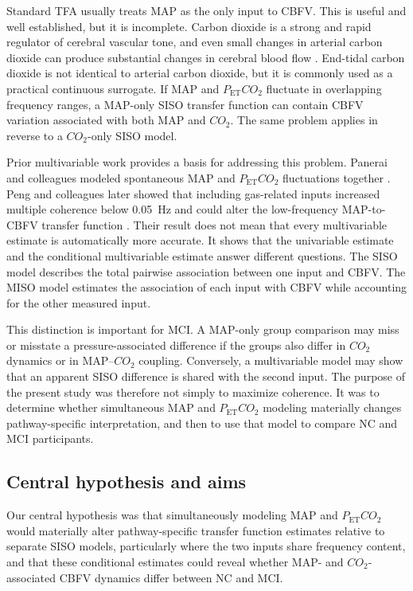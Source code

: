 \documentclass[12pt]{article}
\newcommand{\PETCOtwo}{P_{\mathrm{ET}}CO_2}
\newcommand{\COtwo}{CO_2}
\begin{document}
Standard TFA usually treats MAP as the only input to CBFV. This is useful and
well established, but it is incomplete. Carbon dioxide is a strong and rapid
regulator of cerebral vascular tone, and even small changes in arterial carbon
dioxide can produce substantial changes in cerebral blood flow
\cite{Hoiland2019}. End-tidal carbon dioxide is not identical to arterial
carbon dioxide, but it is commonly used as a practical continuous surrogate.
If MAP and $\PETCOtwo$ fluctuate in overlapping frequency ranges, a MAP-only
SISO transfer function can contain CBFV variation associated with both MAP
and $\COtwo$. The same problem applies in reverse to a $\COtwo$-only SISO
model.

Prior multivariable work provides a basis for addressing this problem.
Panerai and colleagues modeled spontaneous MAP and $\PETCOtwo$ fluctuations
together \cite{Panerai2000}. Peng and colleagues later showed that including
gas-related inputs increased multiple coherence below 0.05~Hz and could alter
the low-frequency MAP-to-CBFV transfer function \cite{Peng2008}. Their result
does not mean that every multivariable estimate is automatically more
accurate. It shows that the univariable estimate and the conditional
multivariable estimate answer different questions. The SISO model describes
the total pairwise association between one input and CBFV. The MISO model
estimates the association of each input with CBFV while accounting for the
other measured input.

This distinction is important for MCI. A MAP-only group comparison may miss
or misstate a pressure-associated difference if the groups also differ in
$\COtwo$ dynamics or in MAP--$\COtwo$ coupling. Conversely, a multivariable
model may show that an apparent SISO difference is shared with the second
input. The purpose of the present study was therefore not simply to maximize
coherence. It was to determine whether simultaneous MAP and $\PETCOtwo$
modeling materially changes pathway-specific interpretation, and then to use
that model to compare NC and MCI participants.

\subsection{Central hypothesis and aims}

Our central hypothesis was that simultaneously modeling MAP and $\PETCOtwo$
would materially alter pathway-specific transfer function estimates relative
to separate SISO models, particularly where the two inputs share frequency
content, and that these conditional estimates could reveal whether MAP- and
$\COtwo$-associated CBFV dynamics differ between NC and MCI.
\end{document}
